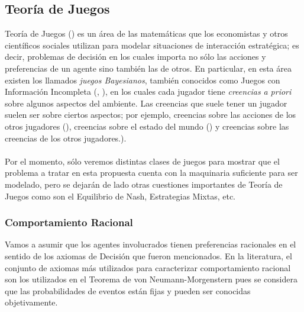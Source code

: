 \documentclass[11pt]{article}
\theoremstyle{plain}
\begin{document}
\subsection{Teoría de Juegos}
Teoría de Juegos (\cite{osborne1994course}) es un área de las matemáticas que los economistas y otros científicos sociales utilizan para modelar situaciones de interacción estratégica; es decir, problemas de decisión en los cuales importa no sólo las acciones y preferencias de un agente sino también las de otros. En particular, en esta área existen los llamados \textit{juegos Bayesianos}, también conocidos como Juegos con Información Incompleta (\cite{osborne1994course}, \cite{10.1007/978-94-010-0189-2_25}),  en los cuales cada jugador tiene \textit{creencias} \textit{a priori} sobre algunos aspectos del ambiente. Las creencias que suele tener un jugador suelen ser sobre ciertos aspectos; por ejemplo, creencias sobre las acciones de los otros jugadores (\cite{costa2008stated}), creencias sobre el estado del mundo (\cite{dominitz2009empirical}) y creencias sobre las creencias de los otros jugadores.).\\
\\
\indent Por el momento, sólo veremos distintas clases de juegos para mostrar que el problema a tratar en esta propuesta cuenta con la maquinaria suficiente para ser modelado, pero se dejarán de lado otras cuestiones importantes de Teoría de Juegos como son el Equilibrio de Nash, Estrategias Mixtas, etc. 
\subsubsection{Comportamiento Racional}
Vamos a asumir que los agentes involucrados tienen preferencias racionales en el sentido de los axiomas de Decisión que fueron mencionados. En la literatura, el conjunto de axiomas más utilizados para caracterizar comportamiento racional son los utilizados en el Teorema de von Neumann-Morgenstern pues se considera que las probabilidades de eventos están fijas y pueden ser conocidas objetivamente.
\end{document}
